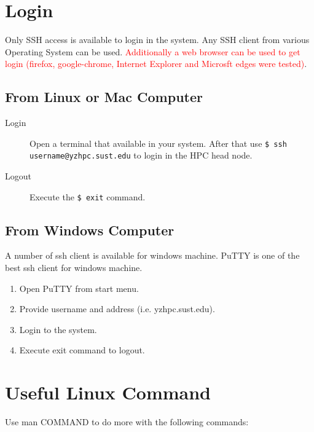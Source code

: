 \documentclass{book}
\begin{document}
\section{Login}%
\label{sec:login}

Only SSH access is available to login in the system. Any SSH client from various Operating System can be used. \textcolor{red}{Additionally a web browser can be used to get login (firefox, google-chrome, Internet Explorer and Microsft edges were tested)}.

\subsection{From Linux or Mac Computer}%
\label{sub:from_linux_or_mac}

\begin{description}
	\item[Login] Open a terminal that available in your system. After that use \texttt{\$ ssh username@yzhpc.sust.edu} to login in the HPC head node.
	\item[Logout] Execute the \texttt{\$ exit} command.
\end{description}

\subsection{From Windows Computer}%
\label{sub:from_windows_computer}

A number of ssh client is available for windows machine. PuTTY is one of the best ssh client for windows machine.

\begin{enumerate}
	\item Open PuTTY from start menu.
	\item Provide username and address (i.e. yzhpc.sust.edu).
	\item Login to the system.
	\item Execute exit command to logout.
\end{enumerate}

\section{Useful Linux Command}%
\label{sec:useful_linux_command}

Use man COMMAND to do more with the following commands:
\end{document}
